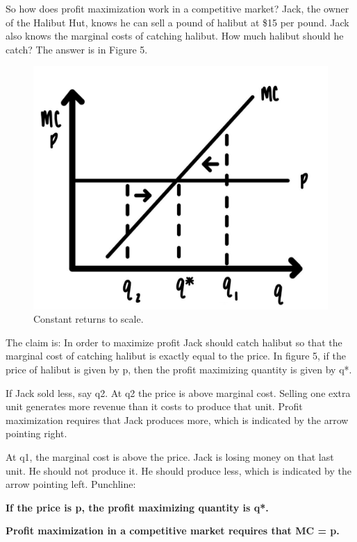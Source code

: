 \documentclass[
]{book}
\begin{document}
So how does profit maximization work in a competitive market? Jack, the owner of the Halibut Hut, knows he can sell a pound of halibut at \$15 per pound. Jack also knows the marginal costs of catching halibut. How much halibut should he catch? The answer is in Figure 5.

\begin{figure}

{\centering \includegraphics[width=0.75\linewidth]{img/ch4/fig5} 

}

\caption{Constant returns to scale.}\label{fig:fig405}
\end{figure}

The claim is: In order to maximize profit Jack should catch halibut so that the marginal cost of catching halibut is exactly equal to the price. In figure 5, if the price of halibut is given by p, then the profit maximizing quantity is given by q*.

If Jack sold less, say q2. At q2 the price is above marginal cost. Selling one extra unit generates more revenue than it costs to produce that unit. Profit maximization requires that Jack produces more, which is indicated by the arrow pointing right.

At q1, the marginal cost is above the price. Jack is losing money on that last unit. He should not produce it. He should produce less, which is indicated by the arrow pointing left.
Punchline:

\begin{iucolor}
\textbf{If the price is p, the profit maximizing quantity is q*.}

\textbf{Profit maximization in a competitive market requires that MC = p.}

\end{iucolor}
\end{document}
